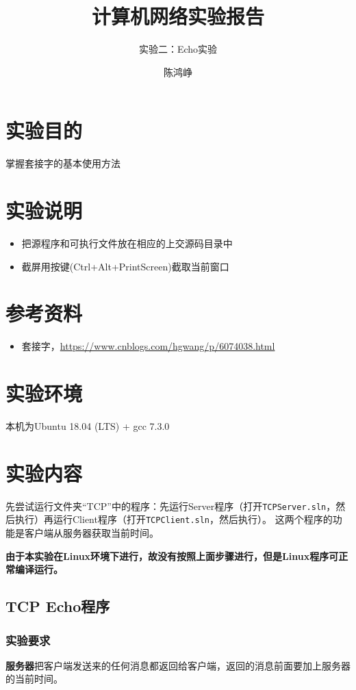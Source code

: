 \documentclass[logo,reportComp]{thesis}
\title{计算机网络实验报告}
\subtitle{实验二：Echo实验}
\author{陈鸿峥}
\begin{document}
\maketitle

\section{实验目的}
掌握套接字的基本使用方法

\section{实验说明}
\begin{itemize}
	\item 把源程序和可执行文件放在相应的上交源码目录中
	\item 截屏用按键(Ctrl+Alt+PrintScreen)截取当前窗口
\end{itemize}

\section{参考资料}
\begin{itemize}
	\item 套接字，\url{https://www.cnblogs.com/hgwang/p/6074038.html}
\end{itemize}

\section{实验环境}
本机为Ubuntu 18.04 (LTS) + gcc 7.3.0

\section{实验内容}
先尝试运行文件夹“TCP”中的程序：先运行Server程序（打开\verb'TCPServer.sln'，然后执行）再运行Client程序（打开\verb'TCPClient.sln'，然后执行）。
这两个程序的功能是客户端从服务器获取当前时间。

\textbf{由于本实验在Linux环境下进行，故没有按照上面步骤进行，但是Linux程序可正常编译运行。}

\subsection{TCP Echo程序}
\subsubsection{实验要求}
\textbf{服务器}把客户端发送来的任何消息都返回给客户端，返回的消息前面要加上服务器的当前时间。
\end{document}
